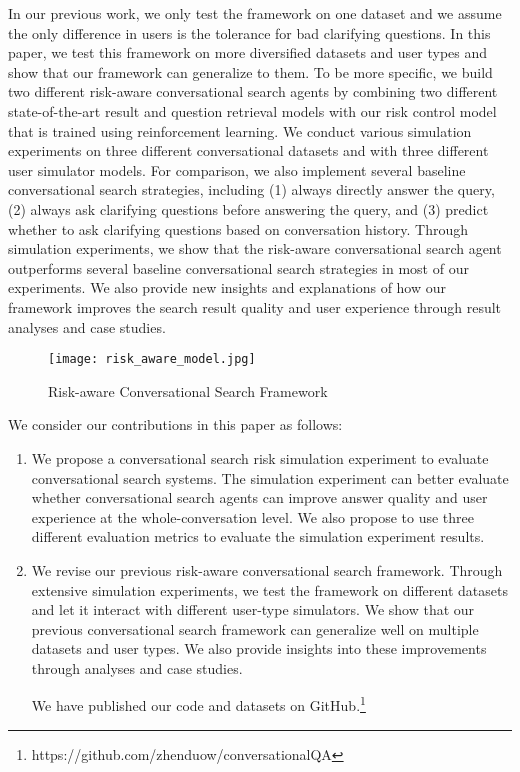 \documentclass[format=acmsmall, review=False, screen=true]{acmart}
\begin{document}
In our previous work, we only test the framework on one dataset and we assume the only difference in users is the tolerance for bad clarifying questions. In this paper, we test this framework on more diversified datasets and user types and show that our framework can generalize to them. To be more specific, we build two different risk-aware conversational search agents by combining two different state-of-the-art result and question retrieval models with our risk control model that is trained using reinforcement learning. We conduct various simulation experiments on three different conversational datasets and with three different user simulator models. For comparison, we also implement several baseline conversational search strategies, including (1) always directly answer the query, (2) always ask clarifying questions before answering the query, and (3) predict whether to ask clarifying questions based on conversation history. Through simulation experiments, we show that the risk-aware conversational search agent outperforms several baseline conversational search strategies in most of our experiments. We also provide new insights and explanations of how our framework improves the search result quality and user experience through result analyses and case studies.

\begin{figure}[h]
  \centering
  \texttt{[image: risk\_aware\_model.jpg]}
  \caption{Risk-aware Conversational Search Framework}
  \label{riskawareframework}
\end{figure}


We consider our contributions in this paper as follows: 
\begin{enumerate}
    \item We propose a conversational search risk simulation experiment to evaluate conversational search systems. The simulation experiment can better evaluate whether conversational search agents can improve answer quality and user experience at the whole-conversation level. We also propose to use three different evaluation metrics to evaluate the simulation experiment results.
    
    \item We revise our previous risk-aware conversational search framework. Through extensive simulation experiments, we test the framework on different datasets and let it interact with different user-type simulators. We show that our previous conversational search framework can generalize well on multiple datasets and user types. We also provide insights into these improvements through analyses and case studies.
    
We have published our code and datasets on GitHub.\footnote{https://github.com/zhenduow/conversationalQA} 
\end{enumerate}
\end{document}
